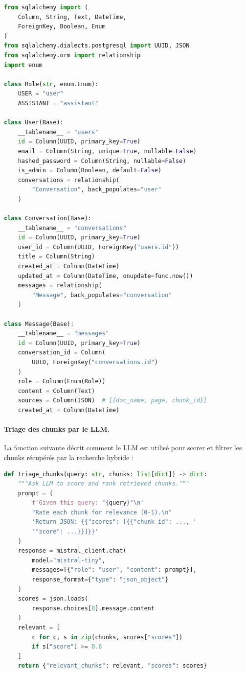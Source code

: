 \documentclass[12pt,a4paper,oneside]{report}
\begin{document}
\begin{lstlisting}[caption={Mod\`{e}le de donn\'{e}es SQLAlchemy (simplifi\'{e}).},label={lst:data_model},language=Python,frame=l,framesep=6pt,framerule=2pt,rulecolor=\color{mainblue}]
from sqlalchemy import (
    Column, String, Text, DateTime,
    ForeignKey, Boolean, Enum
)
from sqlalchemy.dialects.postgresql import UUID, JSON
from sqlalchemy.orm import relationship
import enum

class Role(str, enum.Enum):
    USER = "user"
    ASSISTANT = "assistant"

class User(Base):
    __tablename__ = "users"
    id = Column(UUID, primary_key=True)
    email = Column(String, unique=True, nullable=False)
    hashed_password = Column(String, nullable=False)
    is_admin = Column(Boolean, default=False)
    conversations = relationship(
        "Conversation", back_populates="user"
    )

class Conversation(Base):
    __tablename__ = "conversations"
    id = Column(UUID, primary_key=True)
    user_id = Column(UUID, ForeignKey("users.id"))
    title = Column(String)
    created_at = Column(DateTime)
    updated_at = Column(DateTime, onupdate=func.now())
    messages = relationship(
        "Message", back_populates="conversation"
    )

class Message(Base):
    __tablename__ = "messages"
    id = Column(UUID, primary_key=True)
    conversation_id = Column(
        UUID, ForeignKey("conversations.id")
    )
    role = Column(Enum(Role))
    content = Column(Text)
    sources = Column(JSON)  # [{doc_name, page, chunk_id}]
    created_at = Column(DateTime)
\end{lstlisting}

\paragraph{Triage des chunks par le LLM.}
La fonction suivante d\'{e}crit comment le LLM est utilis\'{e} pour scorer et filtrer les chunks r\'{e}cup\'{e}r\'{e}s par la recherche hybride :

\begin{lstlisting}[caption={Fonction de scoring des chunks par le LLM (triage).},label={lst:triage_code},language=Python,frame=l,framesep=6pt,framerule=2pt,rulecolor=\color{mainblue}]
def triage_chunks(query: str, chunks: list[dict]) -> dict:
    """Ask LLM to score and rank retrieved chunks."""
    prompt = (
        f'Given this query: "{query}"\n'
        "Rate each chunk for relevance (0-1).\n"
        'Return JSON: {{"scores": [{{"chunk_id": ..., '
        '"score": ...}}]}}'
    )
    response = mistral_client.chat(
        model="mistral-tiny",
        messages=[{"role": "user", "content": prompt}],
        response_format={"type": "json_object"}
    )
    scores = json.loads(
        response.choices[0].message.content
    )
    relevant = [
        c for c, s in zip(chunks, scores["scores"])
        if s["score"] >= 0.6
    ]
    return {"relevant_chunks": relevant, "scores": scores}
\end{lstlisting}
\end{document}
